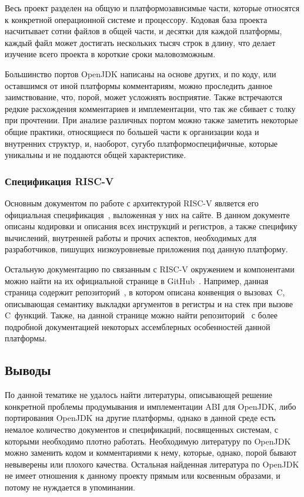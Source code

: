Весь проект разделен на общую и платформозависимые части, которые относятся к конкретной операционной системе и процессору. Кодовая база проекта насчитывает сотни файлов в общей части, и десятки для каждой платформы, каждый файл может достигать нескольких тысяч строк в длину, что делает изучение всего проекта в короткие сроки маловозможным.

Большинство портов OpenJDK написаны на основе других, и по коду, или оставшимся от иной платформы комментариям, можно проследить данное заимствование, что, порой, может усложнять восприятие. Также встречаются редкие расхождения комментариев и имплементации, что так же сбивает с толку при прочтении. При анализе различных портом можно также заметить некоторые общие практики, относящиеся по большей части к организации кода и внутренних структур, и, наоборот, сугубо платформоспецифичные, которые уникальны и не поддаются общей характеристике.


\subsubsection*{Спецификация RISC-V}

Основным документом по работе с архитектурой RISC-V является его официальная спецификация~\cite{riscv:spec}, выложенная у них на сайте. В данном документе описаны кодировки и описания всех инструкций и регистров, а также специфику вычислений, внутренней работы и прочих аспектов, необходимых для разработчиков, пишущих низкоуровневые приложения под данную платформу. 

Остальную документацию по связанным с RISC-V окружением и компонентами можно найти на их официальной странице в GitHub~\cite{riscv:github}. Например, данная страница содержит репозиторий~\cite{riscv:convention}, в котором описана конвенция о вызовах~C, описывающая семантику выкладки аргументов в регистры и на стек при вызове C~функций. Также, на данной странице можно найти репозиторий~\cite{riscv:asm} с более подробной документацией некоторых ассемблерных особенностей данной платформы.


\subsection*{Выводы}

По данной тематике не удалось найти литературы, описывающей решение конкретной проблемы продумывания и имплементации ABI для OpenJDK, либо портирования OpenJDK на другие платформы, однако в данной среде есть немалое количество документов и спецификаций, посвященных системам, с которыми необходимо плотно работать. Необходимую литературу по OpenJDK можно заменить кодом и комментариями к нему, которые, однако, порой бывают невыверены или плохого качества. Остальная найденная литература по OpenJDK не имеет отношения к данному проекту прямым или косвенным образами, и потому не нуждается в упоминании.
